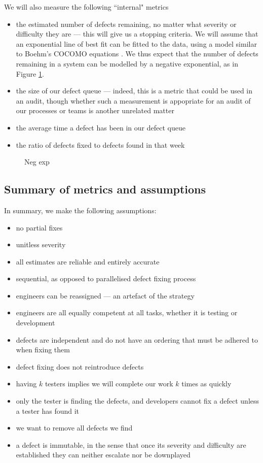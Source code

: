We will also measure the following ``internal" metrics
\begin{itemize}
	\item the estimated number of defects remaining, no matter what severity or difficulty they are
--- this will give us a stopping criteria.
	We will assume that an exponential line of best fit can be fitted to the data, using a model
similar to Boehm's COCOMO equations \FIXME.
	We thus expect that the number of defects remaining in a system can be modelled by a negative
exponential, as in Figure \ref{negExp}.
	\item the size of our defect queue --- indeed, this is a metric that could be used in an audit,
though whether such a measurement is appopriate for an audit of our processes or teams is another
unrelated matter
	\item the average time a defect has been in our defect queue
	\item the ratio of defects fixed to defects found in that week
\end{itemize}

\begin{figure}[ht!]
	\caption{Neg exp \FIXME} \label{negExp}
\end{figure}

\subsection{Summary of metrics and assumptions}

In summary, we make the following assumptions:
\begin{itemize}
	\item no partial fixes
	\item unitless severity
	\item all estimates are reliable and entirely accurate
	\item sequential, as opposed to parallelised defect fixing process
	\item engineers can be reassigned --- an artefact of the strategy
	\item engineers are all equally competent at all tasks, whether it is testing or development
	\item defects are independent and do not have an ordering that must be adhered to when fixing them
	\item defect fixing does not reintroduce defects
	\item having $k$ testers implies we will complete our work $k$ times as quickly
	\item only the tester is finding the defects, and developers cannot fix a defect unless a tester
has found it
  \item we want to remove all defects we find
	\item a defect is immutable, in the sense that once its severity and difficulty are established
they can neither escalate nor be downplayed
\end{itemize}

